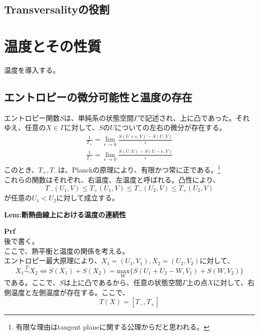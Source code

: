 \documentclass[a4paper,11pt]{jsarticle}
\numberwithin{equation}{section}
\begin{document}
\subsection{Transversalityの役割}

\section{温度とその性質}
温度を導入する。\\
\subsection{エントロピーの微分可能性と温度の存在}
エントロピー関数$S$は、単純系の状態空間$\Gamma$で記述され、上に凸であった。それゆえ、任意の$X \in \Gamma$に対して、$S$の$U$についての左右の微分が存在する。\\
\begin{align}
    \frac{1}{T_+} =\lim_{\epsilon \to 0} \frac{S(U+\epsilon,V)-S(U,V)}{\epsilon}\\
    \frac{1}{T_-} =\lim_{\epsilon \to 0} \frac{S(U,V)-S(U-\epsilon,V)}{\epsilon}
\end{align}
このとき、$T_+,T_-$は、Planckの原理により、有限かつ常に正である。\footnote{有限な理由はtangent planeに関する公理からだと思われる。}\\
これらの関数はそれぞれ、右温度、左温度と呼ばれる。凸性により、
\begin{equation}
    T_-(U_1,V) \leq T_+(U_1,V) \leq T_-(U_2,V) \leq T_+(U_2,V)
\end{equation}
が任意の$U_1<U_2$に対して成立する。\\

\begin{itembox}[l]{\textbf{Lem:断熱曲線上における温度の連続性}}


\end{itembox}
\textbf{Prf}\\
後で書く。\hfill\qedsymbol\\

ここで、熱平衡と温度の関係を考える。\\
エントロピー最大原理により、$X_1=(U_1,V_1),X_2=(U_2,V_2)$に対して、
\begin{equation}
    X_1 \overset{T}{\sim} X_2 \Leftrightarrow S(X_1) +S(X_2) =\underset{W}{\text{max}}\{S(U_1+U_2-W,V_1)+S(W,V_2)\}
\end{equation}
である。ここで、$S$は上に凸であるから、任意の状態空間$\Gamma$上の点$X$に対して、右側温度と左側温度が存在する。ここで、
\begin{equation}
    T(X) = [T_-,T_+]
\end{equation}
\end{document}
